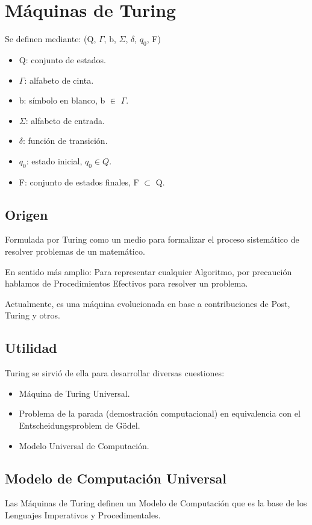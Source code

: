 \section{Máquinas de Turing}
Se definen mediante: (Q, $\Gamma$, b, $\Sigma$, $\delta$, $q_0$, F)
\begin{itemize}
    \item Q: conjunto de estados.
    \item $\Gamma$: alfabeto de cinta.
    \item b: símbolo en blanco, b $\in$ $\Gamma$.
    \item $\Sigma$: alfabeto de entrada.
    \item $\delta$: función de transición.
    \item $q_0$: estado inicial, $q_0 \in Q$.
    \item F: conjunto de estados finales, F $\subset$ Q.
\end{itemize}

\subsection{Origen}
Formulada por Turing como un medio para formalizar el proceso sistemático de resolver problemas de un matemático.

En sentido más amplio: Para representar cualquier Algoritmo, por precaución hablamos de Procedimientos Efectivos para resolver un problema.

Actualmente, es una máquina evolucionada en base a contribuciones de Post, Turing y otros.

\subsection{Utilidad}
Turing se sirvió de ella para desarrollar diversas cuestiones: 
\begin{itemize}
    \item Máquina de Turing Universal.
    \item Problema de la parada (demostración computacional) en equivalencia con el Entscheidungsproblem de Gödel.
    \item Modelo Universal de Computación.
\end{itemize}

\subsection{Modelo de Computación Universal}
Las Máquinas de Turing definen un Modelo de Computación que es la base de los Lenguajes Imperativos y Procedimentales.

